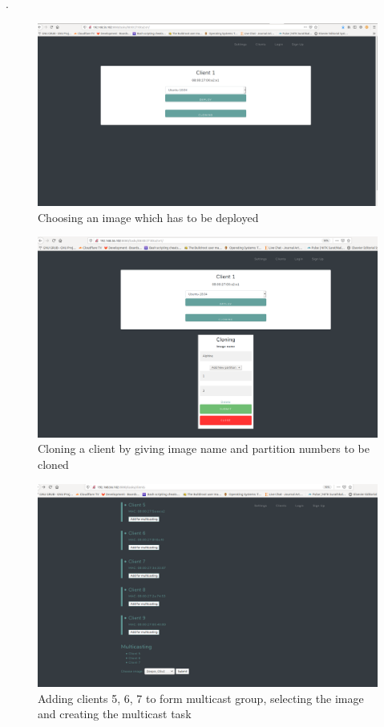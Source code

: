 \documentclass[a4paper,12pt]{article}
\begin{document}
.
\begin{figure}
    \centering
    \includegraphics[width=\linewidth]{Deployment.png}
    \caption{Choosing an image which has to be deployed}
    \label{task_image_deploy}
\end{figure}
\begin{figure}
    \centering
    \includegraphics[width=\linewidth]{Cloning_2.png}
    \caption{Cloning a client by giving image name and partition numbers to be cloned}
    \label{cloning}
\end{figure}
\begin{figure}
    \centering
    \includegraphics[width=\linewidth]{Multicast.png}
    \caption{Adding clients 5, 6, 7 to form multicast group, selecting the image and creating the multicast task}
    \label{multicast_group}
\end{figure}
\end{document}

